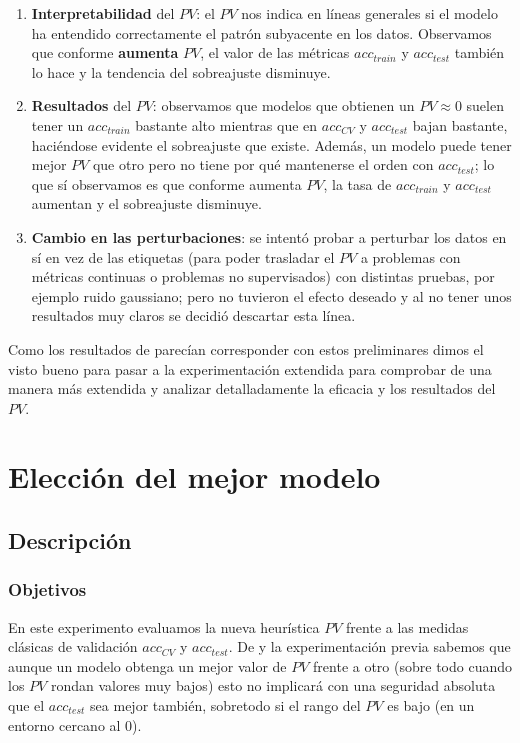 \begin{enumerate}
  \item \textbf{Interpretabilidad} del $PV$: el $PV$ nos indica en líneas generales si el modelo ha entendido correctamente el patrón subyacente en los datos. Observamos que conforme \textbf{aumenta} $PV$, el valor de las métricas $acc_{train}$ y $acc_{test}$ también lo hace y la tendencia del sobreajuste disminuye.

  \item \textbf{Resultados} del $PV$: observamos que modelos que obtienen un $PV \approx 0$ suelen tener un $acc_{train}$ bastante alto mientras que en $acc_{CV}$ y $acc_{test}$ bajan bastante, haciéndose evidente el sobreajuste que existe. Además, un modelo puede tener mejor $PV$ que otro pero no tiene por qué mantenerse el orden con $acc_{test}$; lo que sí observamos es que conforme aumenta $PV$, la tasa de $acc_{train}$ y $acc_{test}$ aumentan y el sobreajuste disminuye.

  \item \textbf{Cambio en las perturbaciones}: se intentó probar a perturbar los datos en sí en vez de las etiquetas (para poder trasladar el $PV$ a problemas con métricas continuas o problemas no supervisados) con distintas pruebas, por ejemplo ruido gaussiano; pero no tuvieron el efecto deseado y al no tener unos resultados muy claros se decidió descartar esta línea.

\end{enumerate}

Como los resultados de \cite{zhang2019perturbation} parecían corresponder con estos preliminares dimos el visto bueno para pasar a la experimentación extendida para comprobar de una manera más extendida y analizar detalladamente la eficacia y los resultados del $PV$.

\section{Elección del mejor modelo}

\subsection{Descripción}

\subsubsection{Objetivos}

En este experimento evaluamos la nueva heurística $PV$ frente a las medidas clásicas de validación $acc_{CV}$ y $acc_{test}$. De \cite{zhang2019perturbation} y la experimentación previa sabemos que aunque un modelo obtenga un mejor valor de $PV$ frente a otro (sobre todo cuando los $PV$ rondan valores muy bajos) esto no implicará con una seguridad absoluta que el $acc_{test}$ sea mejor también, sobretodo si el rango del $PV$ es bajo (en un entorno cercano al 0).


